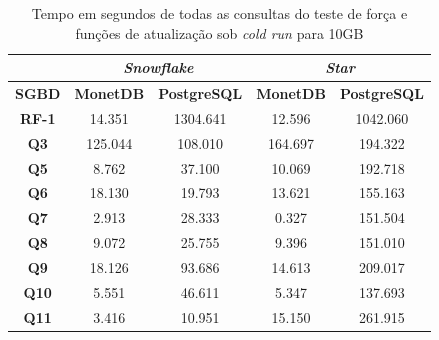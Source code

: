 \begin{table}[t]
        \centering
        \caption{Tempo em segundos de todas as consultas do teste de força e funções de atualização sob \textit{cold run} para 10GB}
        \label{tab:queries_cold_10}
        \begin{tabular}{|c|c|c|c|c|} 
                \cline{2-5}
                \multicolumn{1}{c|}{} & \multicolumn{2}{c|}{\textit{\textbf{Snowflake}} } & \multicolumn{2}{c|}{\textit{\textbf{Star}} }  \\ 
                \hline
                 \textbf{SGBD}        & \textbf{MonetDB}  & \textbf{PostgreSQL}           & \textbf{MonetDB}  & \textbf{PostgreSQL}       \\ 
                \hline
                 \textbf{RF-1}        & 14.351            & 1304.641                      & 12.596            & 1042.060                  \\ 
                \hline
                 \textbf{Q3}          & 125.044           & 108.010                       & 164.697           & 194.322                   \\ 
                \hline
                 \textbf{Q5}          & 8.762             & 37.100                        & 10.069            & 192.718                   \\ 
                \hline
                 \textbf{Q6}          & 18.130            & 19.793                        & 13.621            & 155.163                   \\ 
                \hline
                 \textbf{Q7}          & 2.913             & 28.333                        & 0.327             & 151.504                   \\ 
                \hline
                 \textbf{Q8}          & 9.072             & 25.755                        & 9.396             & 151.010                   \\ 
                \hline
                 \textbf{Q9}          & 18.126            & 93.686                        & 14.613            & 209.017                   \\ 
                \hline
                 \textbf{Q10}         & 5.551             & 46.611                        & 5.347             & 137.693                   \\ 
                \hline
                 \textbf{Q11}         & 3.416             & 10.951                        & 15.150            & 261.915                   \\ 
                \hline

\end{tabular}
\end{table}
